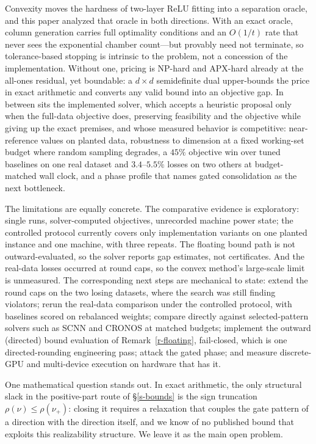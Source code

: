 \documentclass[12pt]{article}
\theoremstyle{plain}
\theoremstyle{definition}
\begin{document}
Convexity moves the hardness of two-layer ReLU fitting into a separation
oracle, and this paper analyzed that oracle in both directions. With an exact
oracle, column generation carries full optimality conditions and an $O(1/t)$
rate that never sees the exponential chamber count---but provably need not
terminate, so tolerance-based stopping is intrinsic to the problem, not a
concession of the implementation. Without one, pricing is NP-hard and
APX-hard already at the all-ones residual, yet boundable: a $d\times d$
semidefinite dual upper-bounds the price in exact arithmetic and converts any
valid bound into an objective gap. In between sits the implemented solver,
which accepts a heuristic proposal only when the full-data objective does,
preserving feasibility and the objective while giving up the exact
premises, and whose measured behavior is competitive: near-reference values
on planted data, robustness to dimension at a fixed working-set budget where
random
sampling degrades, a $45\%$ objective win over tuned baselines on one real
dataset and $3.4$--$5.5\%$ losses on two others at budget-matched wall clock, and a
phase profile that names gated consolidation as the next bottleneck.

The limitations are equally concrete. The comparative evidence is
exploratory: single runs, solver-computed objectives, unrecorded machine
power state; the controlled protocol currently covers only implementation
variants on one planted instance and one machine, with three repeats. The
floating bound path is not outward-evaluated, so the solver reports gap
estimates, not certificates. And the real-data losses occurred at round caps,
so the convex method's large-scale limit is unmeasured. The corresponding
next steps are mechanical to state: extend the round caps on the two losing
datasets, where the search was still finding violators; rerun the real-data
comparison under the controlled protocol, with baselines scored on rebalanced
weights; compare directly against selected-pattern solvers such as SCNN and
CRONOS at matched budgets; implement the outward (directed) bound evaluation
of Remark~\ref{r-floating}, fail-closed, which is one directed-rounding
engineering pass; attack the gated phase; and measure discrete-GPU and
multi-device execution on hardware that has it.

One mathematical question stands out. In exact arithmetic, the only
structural slack in the positive-part route of \S\ref{s-bounds} is the sign
truncation $\rho(\nu)\le\rho(\nu_+)$: closing it requires a relaxation that
couples the gate pattern of a direction with the direction itself, and we
know of no published bound that exploits this realizability structure. We
leave it as the main open problem.
\end{document}
